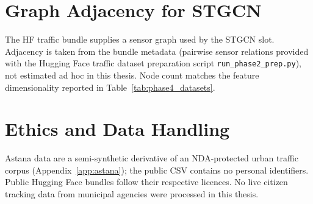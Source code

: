 \section{Graph Adjacency for STGCN}

The HF traffic bundle supplies a sensor graph used by the STGCN slot. Adjacency is taken from the bundle metadata (pairwise sensor relations provided with the Hugging Face traffic dataset preparation script \texttt{run\_phase2\_prep.py}), not estimated ad hoc in this thesis. Node count matches the feature dimensionality reported in Table~\ref{tab:phase4_datasets}.

\section{Ethics and Data Handling}

Astana data are a semi-synthetic derivative of an NDA-protected urban traffic corpus (Appendix~\ref{app:astana}); the public CSV contains no personal identifiers. Public Hugging Face bundles follow their respective licences. No live citizen tracking data from municipal agencies were processed in this thesis.
